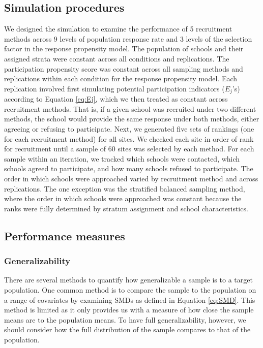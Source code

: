 \documentclass[
  man,floatsintext]{apa6}
\begin{document}
\hypertarget{simulation-procedures}{%
\subsection*{Simulation procedures}\label{simulation-procedures}}

We designed the simulation to examine the performance of 5 recruitment methods across 9 levels of population response rate and 3 levels of the selection factor in the response propensity model. The population of schools and their assigned strata were constant across all conditions and replications. The participation propensity score was constant across all sampling methods and replications within each condition for the response propensity model. Each replication involved first simulating potential participation indicators (\(E_j\)'s) according to Equation \eqref{eq:Ej}, which we then treated as constant across recruitment methods. That is, if a given school was recruited under two different methods, the school would provide the same response under both methods, either agreeing or refusing to participate. Next, we generated five sets of rankings (one for each recruitment method) for all sites.
We checked each site in order of rank for recruitment until a sample of 60 sites was selected by each method. For each sample within an iteration, we tracked which schools were contacted, which schools agreed to participate, and how many schools refused to participate.
The order in which schools were approached varied by recruitment method and across replications. The one exception was the stratified balanced sampling method, where the order in which schools were approached was constant because the ranks were fully determined by stratum assignment and school characteristics.

\hypertarget{performance-measures}{%
\subsection*{Performance measures}\label{performance-measures}}

\hypertarget{generalizability}{%
\subsubsection*{Generalizability}\label{generalizability}}

There are several methods to quantify how generalizable a sample is to a target population. One common method is to compare the sample to the population on a range of covariates by examining SMDs as defined in Equation \eqref{eq:SMD}. This method is limited as it only provides us with a measure of how close the sample means are to the population means.
To have full generalizability, however, we should consider how the full distribution of the sample compares to that of the population.
\end{document}
